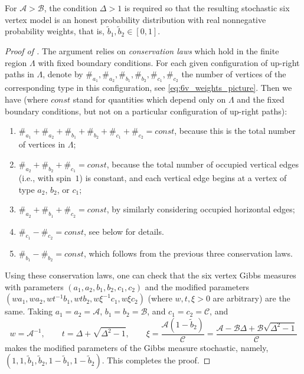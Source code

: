 \documentclass[letterpaper,11pt,oneside,reqno]{article}
\numberwithin{equation}{section}
\theoremstyle{definition}
\theoremstyle{remark}
\begin{document}
For $\mathscr{A}>\mathscr{B}$, the condition $\Delta>1$ is required
so that the resulting stochastic six vertex model
is an honest probability distribution with real nonnegative probability weights, 
that is, $\tilde b_1,\tilde b_2\in[0,1]$.
\begin{proof}[Proof of ]
	The argument relies on \emph{conservation laws} which hold in the finite region $\Lambda$
	with fixed boundary conditions.
	For each given configuration of up-right paths in $\Lambda$, 
	denote by 
	$\#_{a_1},\#_{a_2},\#_{b_1},\#_{b_2},\#_{c_1},\#_{c_2} $
	the number of vertices of the corresponding type in this configuration,
	see \eqref{eq:6v_weights_picture}.
	Then we have (where $const$ stand for quantities which depend only on $\Lambda$ and the
	fixed boundary conditions, but not on a particular configuration of up-right paths):
	\begin{enumerate}[$\bullet$]
		\item $\#_{a_1}+\#_{a_2}+\#_{b_1}+\#_{b_2}+\#_{c_1}+\#_{c_2}=const$, because this is the total number of
			vertices in $\Lambda$;
		\item 
			$\#_{a_2}+\#_{b_2}+\#_{c_1}=const$, because the total number of occupied vertical edges (i.e., with spin~$1$)
			is constant, and each vertical edge begins at a vertex of type $a_2$, $b_2$, or $c_1$;
		\item 
			$\#_{a_2}+\#_{b_1}+\#_{c_2}=const$, by similarly considering occupied horizontal edges;
		\item 
			$\#_{c_1}-\#_{c_2}=const$,
			see  below for details.
		\item 
			$\#_{b_1}-\#_{b_2}=const$, which follows from the previous three conservation laws.
	\end{enumerate}
	
	Using these conservation laws, one can check that the six vertex Gibbs measures
	with parameters $(a_1,a_2,b_1,b_2,c_1,c_2)$ and 
	the modified parameters
	$(w a_1,w a_2,wt^{-1}b_1,w t b_2,w\xi^{-1} c_1,w\xi c_2)$
	(where $w,t,\xi >0$ are arbitrary)
	are the same. Taking
	$a_1=a_2=\mathscr{A}$, $b_1=b_2=\mathscr{B}$, and $c_1=c_2=\mathscr{C}$, and
	\begin{equation*}
		w=\mathscr{A}^{-1},\qquad 
		t=\Delta+\sqrt{\Delta^2-1},\qquad 
		\xi=\frac{\mathscr{A}(1-\tilde b_2)}{\mathscr{C}}
		=
		\frac{\mathscr{A}-\mathscr{B}\Delta+\mathscr{B}\sqrt{\Delta^2-1}}{\mathscr{C}}
	\end{equation*}
	makes the 
	modified parameters
	of the Gibbs measure stochastic, namely,
	$(1,1,\tilde b_1,\tilde b_2,1-\tilde b_1,1-\tilde b_2)$. This completes the proof.
\end{proof}
\end{document}
